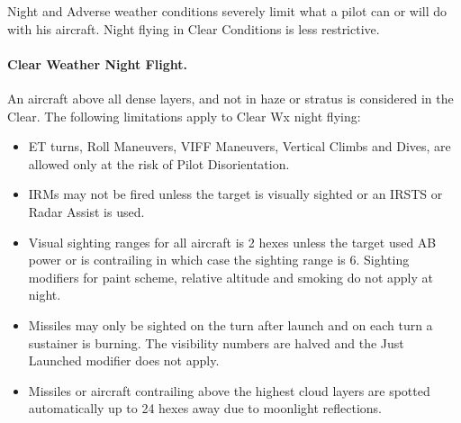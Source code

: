 \begin{advancedrules}
{Night and Adverse weather conditions severely limit what a pilot can or will do with his aircraft. Night flying in Clear Conditions is less restrictive.


\paragraph{Clear Weather Night Flight.} An aircraft above all dense layers, and not in haze or stratus is considered in the Clear. The following limitations apply to Clear Wx night flying:

\begin{itemize}

    \item ET turns, Roll Maneuvers, VIFF Maneuvers, Vertical Climbs and Dives,  are allowed only at the risk of Pilot Disorientation.

    \item IRMs may not be fired unless the target is visually sighted or an IRSTS or Radar Assist is used.

    \item Visual sighting ranges for all aircraft is 2 hexes unless the target used AB power or is contrailing in which case the sighting range is 6. Sighting modifiers for paint scheme, relative altitude and smoking do not apply at night.

    \item Missiles may only be sighted on the turn after launch and on each turn a sustainer is burning. The visibility numbers are halved and the Just Launched modifier does not apply.

    \item Missiles or aircraft contrailing above the highest cloud layers are spotted automatically up to 24 hexes away due to moonlight reflections.


\end{itemize}}
\end{advancedrules}
